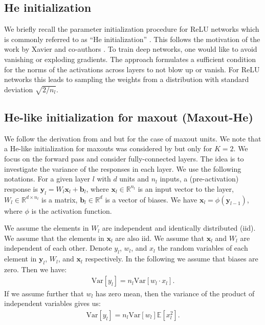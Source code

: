 \documentclass{article}
\theoremstyle{definition}
\newcommand{\var}{\mathrm{Var}}
\begin{document}
\subsection{He initialization}
We briefly recall the parameter initialization procedure for ReLU networks which is commonly referred to as ``He initialization'' \citep{he2015delving}. 
This follows the motivation of the work by Xavier and co-authors \citep{glorot2010understanding}. 
To train deep networks, one would like to avoid vanishing or exploding gradients. 
The approach formulates a sufficient condition for the norms of the activations across layers to not blow up or vanish. 
For ReLU networks this leads to sampling the weights from a distribution with standard deviation $\sqrt{2/n_l}$.

\subsection{He-like initialization for maxout (Maxout-He)}
\label{app:he-like-maxout}
    We follow the derivation from \citet{glorot2010understanding} and \citet{he2015delving} but for the case of maxout units. 
    We note that a He-like initialization for maxouts was considered by \citet{sun2018improving} but only for $K = 2$. 
    We focus on the forward pass and consider fully-connected layers. 
    The idea is to investigate the variance of the responses in each layer. 
    We use the following notations. 
    For a given layer $l$ with $d$ units and $n_l$ inputs, a (pre-activation) response is $\mathbf{y}_l = W_l \mathbf{x}_l + \mathbf{b}_l$, where $\mathbf{x}_l \in \mathbb{R}^{n_l}$ is an input vector to the layer, $W_l \in \mathbb{R}^{d \times n_l}$ is a matrix, $\mathbf{b}_l \in \mathbb{R}^d$ is a vector of biases.
    We have $\mathbf{x}_l = \phi(\mathbf{y}_{l-1})$, where $\phi$ is the activation function. 
    
    We assume the elements in $W_l$ are independent and identically distributed (iid). 
    We assume that the elements in $\mathbf{x}_l$ are also iid. 
    We assume that $\mathbf{x}_l$ and $W_l$ are independent of each other. 
    Denote $y_l$, $w_l$, and $x_l$ the random variables of each element in $\mathbf{y}_l$, $W_l$, and $\mathbf{x}_l$ respectively. 
    In the following we assume that biases are zero. 
    Then we have: 
    \begin{align*}
        \var[y_l] = n_l \var[w_l \cdot x_l].
    \end{align*}
    If we assume further that $w_l$ has zero mean, then the variance of the product of independent variables gives us:  
    \begin{align}
        \var[y_l] = n_l \var[w_l] \mathbb{E}[x_l^2].
        \label{eq:he_init_var}
    \end{align}
\end{document}
